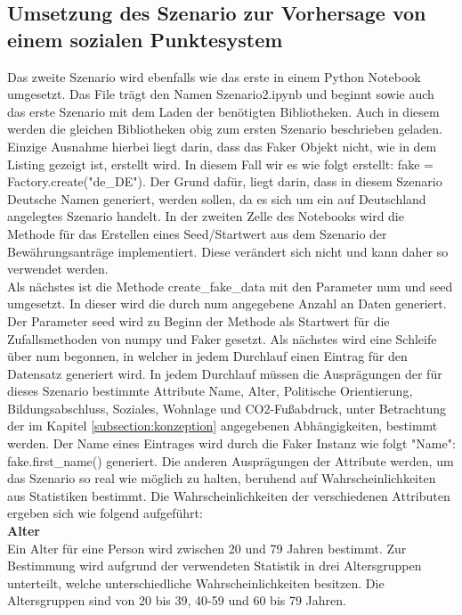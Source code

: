 \begin{onehalfspace}
\subsection{Umsetzung des Szenario zur Vorhersage von einem sozialen Punktesystem}
\label{umsetzungsz2}
Das zweite Szenario wird ebenfalls wie das erste in einem Python Notebook umgesetzt. Das File trägt den Namen \glqq{}Szenario2.ipynb\grqq{} und beginnt sowie auch das erste Szenario mit dem Laden der benötigten Bibliotheken. Auch in diesem werden die gleichen Bibliotheken obig zum ersten Szenario beschrieben geladen. Einzige Ausnahme hierbei liegt darin, dass das Faker Objekt nicht, wie in dem Listing gezeigt ist, erstellt wird. In diesem Fall wir es wie folgt erstellt: \glqq{}fake = Factory.create("de\_DE")\grqq{}. Der Grund dafür, liegt darin, dass in diesem Szenario Deutsche Namen generiert, werden sollen, da es sich um ein auf Deutschland angelegtes Szenario handelt. In der zweiten Zelle des Notebooks wird die Methode für das Erstellen eines Seed/Startwert aus dem Szenario der Bewährungsanträge implementiert. Diese verändert sich nicht und kann daher so verwendet werden.\\
Als nächstes ist die Methode \glqq{}create\_fake\_data\grqq{} mit den Parameter num und seed umgesetzt. In dieser wird die durch num angegebene Anzahl an Daten generiert. Der Parameter seed wird zu Beginn der Methode als Startwert für die Zufallsmethoden von numpy und Faker gesetzt. Als nächstes wird eine Schleife über num begonnen, in welcher in jedem Durchlauf einen Eintrag für den Datensatz generiert wird. In jedem Durchlauf müssen die Ausprägungen der für dieses Szenario bestimmte Attribute Name, Alter, Politische Orientierung, Bildungsabschluss, Soziales, Wohnlage und CO2-Fußabdruck, unter Betrachtung der im Kapitel \ref{subsection:konzeption} angegebenen Abhängigkeiten, bestimmt werden. Der Name eines Eintrages wird durch die Faker Instanz wie folgt \glqq{}"Name": fake.first\_name()\grqq{} generiert. Die anderen Ausprägungen der Attribute werden, um das Szenario so real wie möglich zu halten, beruhend auf Wahrscheinlichkeiten aus Statistiken bestimmt. Die Wahrscheinlichkeiten der verschiedenen Attributen ergeben sich wie folgend aufgeführt:\\
\textbf{Alter}\\
Ein Alter für eine Person wird zwischen 20 und 79 Jahren bestimmt. Zur Bestimmung wird aufgrund der verwendeten Statistik in drei Altersgruppen unterteilt, welche unterschiedliche Wahrscheinlichkeiten besitzen. Die Altersgruppen sind von 20 bis 39, 40-59 und 60 bis 79 Jahren.\\

\end{onehalfspace}
